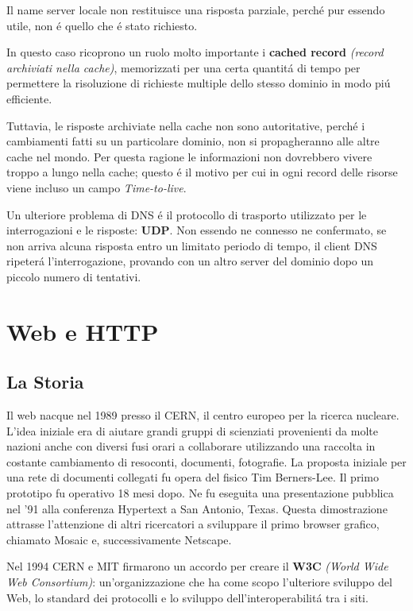 \documentclass[12pt]{article}
\begin{document}
Il name server locale non restituisce una risposta parziale, perch\'e pur essendo utile, non \'e quello che \'e stato richiesto.

In questo caso ricoprono un ruolo molto importante i \textbf{cached record} \textit{(record archiviati nella cache)}, memorizzati 
per una certa quantit\'a di tempo per permettere la risoluzione di richieste multiple dello stesso dominio in modo pi\'u 
efficiente.

Tuttavia, le risposte archiviate nella cache non sono autoritative, perch\'e i cambiamenti fatti su un particolare dominio, non 
si propagheranno alle altre cache nel mondo. Per questa ragione le informazioni non dovrebbero vivere troppo a lungo nella cache; 
questo \'e il motivo per cui in ogni record delle risorse viene incluso un campo \textit{Time-to-live}.

Un ulteriore problema di DNS \'e il protocollo di trasporto utilizzato per le interrogazioni e le risposte: \textbf{UDP}. Non 
essendo ne connesso ne confermato, se non arriva alcuna risposta entro un limitato periodo di tempo, il client DNS ripeter\'a 
l'interrogazione, provando con un altro server del dominio dopo un piccolo numero di tentativi.


\clearpage
\section{Web e HTTP}\label{web-http}

\subsection{La Storia}\label{web-http-la-storia}
Il web nacque nel 1989 presso il CERN, il centro europeo per la ricerca nucleare. L'idea iniziale era di aiutare grandi gruppi di 
scienziati provenienti da molte nazioni anche con diversi fusi orari a collaborare utilizzando una raccolta in costante 
cambiamento di resoconti, documenti, fotografie. La proposta iniziale per una rete di documenti collegati fu opera del fisico Tim 
Berners-Lee. Il primo prototipo fu operativo 18 mesi dopo. Ne fu eseguita una presentazione pubblica nel '91 alla conferenza 
Hypertext a San Antonio, Texas. Questa dimostrazione attrasse l'attenzione di altri ricercatori a sviluppare il primo browser 
grafico, chiamato Mosaic e, successivamente Netscape.

Nel 1994 CERN e MIT firmarono un accordo per creare il \textbf{W3C} \textit{(World Wide Web Consortium)}: un'organizzazione che 
ha come scopo l'ulteriore sviluppo del Web, lo standard dei protocolli e lo sviluppo dell'interoperabilit\'a tra i siti.
\end{document}

